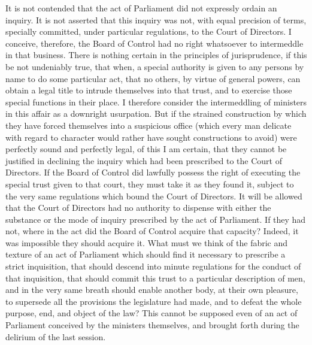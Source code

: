 It is not contended that the act of Parliament did not expressly ordain an inquiry. It is not asserted that this inquiry was not, with equal precision of terms, specially committed, under particular regulations, to the Court of Directors. I conceive, therefore, the Board of Control had no right whatsoever to intermeddle in that business. There is nothing certain in the principles of jurisprudence, if this be not undeniably true, that when, a special authority is given to any persons by name to do some particular act, that no others, by virtue of general powers, can obtain a legal title to intrude themselves into that trust, and to exercise those special functions in their place. I therefore consider the intermeddling of ministers in this affair as a downright usurpation. But if the strained construction by which they have forced themselves into a suspicious office (which every man delicate with regard to character would rather have sought constructions to avoid) were perfectly sound and perfectly legal, of this I am certain, that they cannot be justified in declining the inquiry which had been prescribed to the Court of Directors. If the Board of Control did lawfully possess the right of executing the special trust given to that court, they must take it as they found it, subject to the very same regulations which bound the Court of Directors. It will be allowed that the Court of Directors had no authority to dispense with either the substance or the mode of inquiry prescribed by the act of Parliament. If they had not, where in the act did the Board of Control acquire that capacity? Indeed, it was impossible they should acquire it. What must we think of the fabric and texture of an act of Parliament which should find it necessary to prescribe a strict inquisition, that should descend into minute regulations for the conduct of that inquisition, that should commit this trust to a particular description of men, and in the very same breath should enable another body, at their own pleasure, to supersede all the provisions the legislature had made, and to defeat the whole purpose, end, and object of the law? This cannot be supposed even of an act of Parliament conceived by the ministers themselves, and brought forth during the delirium of the last session.

